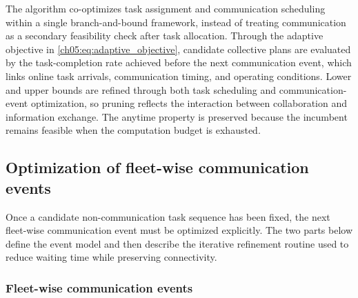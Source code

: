 The algorithm co-optimizes task assignment and communication scheduling within
a single branch-and-bound framework, instead of treating communication as a
secondary feasibility check after task allocation. Through the adaptive
objective in \eqref{ch05:eq:adaptive_objective}, candidate collective plans are
evaluated by the task-completion rate achieved before the next communication
event, which links online task arrivals, communication timing, and operating
conditions. Lower and upper bounds are refined through both task scheduling and
communication-event optimization, so pruning reflects the interaction between
collaboration and information exchange. The anytime property is preserved
because the incumbent remains feasible when the computation budget is exhausted.
























\subsection{Optimization of fleet-wise communication events}
\label{ch05:subsec:comm-event}

Once a candidate non-communication task sequence has been fixed, the next fleet-wise communication event must be optimized explicitly. The two parts below define the event model and then describe the iterative refinement routine used to reduce waiting time while preserving connectivity.

\subsubsection{Fleet-wise communication events}
\label{ch05:subsubsec:comm-event-opt}

